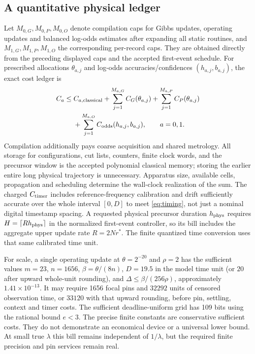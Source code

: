 \subsection{A quantitative physical ledger}

Let $M_{0,G},M_{0,P},M_{0,O}$ denote compilation caps for Gibbs updates,
operating updates and balanced log-odds estimates after expanding all
static routines, and $M_{1,G},M_{1,P},M_{1,O}$ the corresponding per-record
caps. They are obtained directly from the preceding displayed caps and
the accepted first-event schedule. For prescribed allocations
$\theta_{a,j}$ and log-odds accuracies/confidences $(h_{a,j},b_{a,j})$,
the exact cost ledger is
\begin{equation}\label{eq:totalcost}
 \begin{split}
 C_a\le{}& C_{a,\rm classical}
 +\sum_{j=1}^{M_{a,G}} C_G(\theta_{a,j})
 +\sum_{j=1}^{M_{a,P}} C_P(\theta_{a,j})\\
 &+\sum_{j=1}^{M_{a,O}} C_{\rm odds}(h_{a,j},b_{a,j}),
 \qquad a=0,1 .
 \end{split}
\end{equation}
Compilation additionally pays coarse acquisition and shared metrology.
All storage for configurations, cut lists, counters, finite clock words,
and the precursor window is the accepted polynomial classical memory;
storing the earlier entire long physical trajectory is unnecessary.
Apparatus size, available cells, propagation and scheduling determine the
wall-clock realization of the sum. The charged $C_{\rm timer}$ includes
reference-frequency calibration and drift sufficiently accurate over the
whole interval $[0,D]$ to meet \eqref{eq:timing}, not just a nominal digital
timestamp spacing.
A requested physical precursor duration $h_{\rm phys}$ requires
$H=\lceil R h_{\rm phys}\rceil$ in the normalized first-event controller,
so its bill includes the aggregate upper update rate $R=2Nr^*$.
The finite quantized time conversion uses that same calibrated time unit.

For scale, a single operating update at $\theta=2^{-20}$ and $\rho=2$
has the sufficient values $m=23$, $n=1656$, $\beta=\theta/(8n)$,
$D=19.5$ in the model time unit (or $20$ after upward whole-unit rounding), and
$\Delta\le\beta/(256\rho)$, approximately $1.41\times10^{-13}$.
It may require 1656 focal pins and $32292$ units of censored observation
time, or $33120$ with that upward rounding, before pin, settling, context
and timer costs. The sufficient deadline-uniform grid has 109 bits using
the rational bound $e<3$.
The precise finite constants are conservative sufficient costs.
They do not demonstrate an economical device or a universal lower bound.
At small true $\lambda$ this bill remains independent of $1/\lambda$,
but the required finite precision and pin services remain real.

